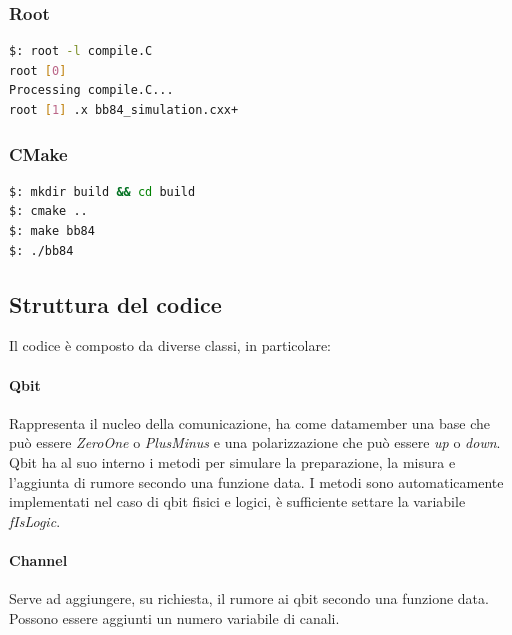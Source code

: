 \documentclass[11 pt, a4paper]{article}
\begin{document}
\subsubsection{Root}
\begin{lstlisting}[language=bash, style=myRoot]
$: root -l compile.C
root [0] 
Processing compile.C...
root [1] .x bb84_simulation.cxx+
\end{lstlisting}

\subsubsection{CMake}
\begin{lstlisting}[language=bash]
$: mkdir build && cd build
$: cmake ..
$: make bb84
$: ./bb84
\end{lstlisting}

\subsection{Struttura del codice}
Il codice è composto da diverse classi, in particolare:
\paragraph{Qbit}
Rappresenta il nucleo della comunicazione, ha come datamember una base che può essere \textit{ZeroOne} o \textit{PlusMinus} e una polarizzazione che può essere \textit{up} o \textit{down}.
Qbit ha al suo interno i metodi per simulare la  preparazione, la misura e l'aggiunta di rumore secondo una funzione data.
I metodi sono automaticamente implementati nel caso di qbit fisici e logici, è sufficiente settare la variabile \textit{fIsLogic}.

\paragraph{Channel}
Serve ad aggiungere, su richiesta, il rumore ai qbit secondo una funzione data.
Possono essere aggiunti un numero variabile di canali.
\end{document}

